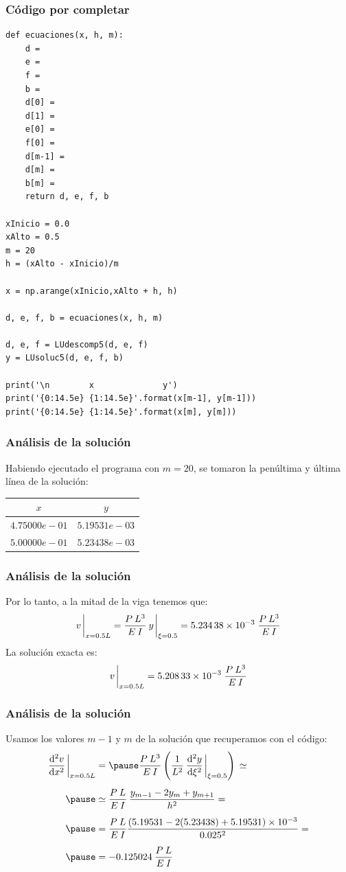 \documentclass[12pt]{beamer}
\begin{document}
\begin{frame}
\frametitle{Código por completar}
\begin{lstlisting}[caption=Código para resolver el problema de la viga]
def ecuaciones(x, h, m):
    d = 
    e = 
    f = 
    b = 
    d[0] = 
    d[1] = 
    e[0] = 
    f[0] = 
    d[m-1] = 
    d[m] = 
    b[m] = 
    return d, e, f, b

xInicio = 0.0
xAlto = 0.5
m = 20
h = (xAlto - xInicio)/m

x = np.arange(xInicio,xAlto + h, h)

d, e, f, b = ecuaciones(x, h, m)

d, e, f = LUdescomp5(d, e, f)
y = LUsoluc5(d, e, f, b)

print('\n        x              y')
print('{0:14.5e} {1:14.5e}'.format(x[m-1], y[m-1]))
print('{0:14.5e} {1:14.5e}'.format(x[m], y[m]))
\end{lstlisting}
\end{frame}
\begin{frame}
\frametitle{Análisis de la solución}
Habiendo ejecutado el programa con $m = 20$, se tomaron la penúltima y última línea de la solución:
\begin{table}
\centering
\begin{tabular}{ | c| c |} \hline
$x$ & $y$ \\ \hline
$4.75000e-01$ & $5.19531e-03$ \\ \hline
$5.00000e-01$ & $5.23438e-03$ \\ \hline
\end{tabular}
\end{table}
\end{frame}
\begin{frame}
\frametitle{Análisis de la solución}
Por lo tanto, a la mitad de la viga tenemos que:
\pause
\begin{align*}
v \eval_{x=0.5 L} = \dfrac{P  \: L^{3}}{E \: I} \: y \eval_{\xi=0.5} = \num{5.23438d-3} \; \dfrac{P \: L^{3}}{E \: I}
\end{align*}
\pause
La solución exacta es:
\pause
\begin{align*}
v \eval_{x=0.5 L} = \num{5.20833d-3} \; \dfrac{P \: L^{3}}{E \: I}
\end{align*}
\end{frame}
\begin{frame}
\frametitle{Análisis de la solución}
Usamos los valores $m-1$ y $m$ de la solución que recuperamos con el código:
\pause
\begin{eqnarray*}
\begin{aligned}
\dv[2]{v}{x} \eval_{x=0.5 L} &= \pause \dfrac{P \: L^{3}}{E \: I} \left( \dfrac{1}{L^{2}} \: \dv[2]{y}{\xi} \eval_{\xi=0.5} \right) \, \simeq \\[0.5em] \pause 
&\simeq  \dfrac{P \: L}{E \: I} \: \dfrac{y_{m-1} - 2 y_{m} + y_{m+1}}{h^{2}} = \\[0.5em] \pause
&= \dfrac{P \: L}{E \: I} \dfrac{(5.19531 - 2(5.23438) + 5.19531) \times 10^{-3}}{0.025^{2}} = \\[0.5em] \pause
&= -0.125024 \: \dfrac{P \: L}{E \: I}
\end{aligned}
\end{eqnarray*}
\end{frame}
\end{document}
